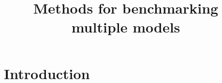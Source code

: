 \documentclass{article}
\title{Methods for benchmarking multiple models}
\author{}
\date{}
\begin{document}
\maketitle




\section{Introduction}
\end{document}
